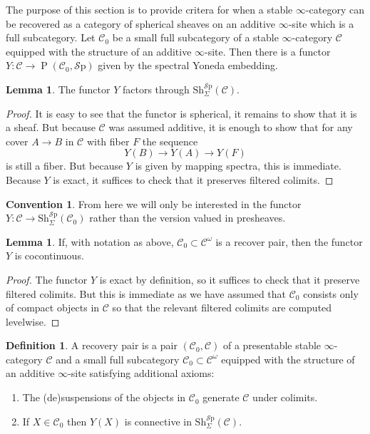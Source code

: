 \documentclass[10pt]{amsart}
\theoremstyle{definition}
\numberwithin{figure}{section}
\numberwithin{equation}{section}
\newtheorem{lemma}[figure]{Lemma}
\newtheorem{definition}[figure]{Definition}
\newtheorem{convention}[figure]{Convention}
\newcommand{\cC}{\mathcal{C}}
\theoremstyle{cited}
\newcommand{\Psh}{\operatorname{P}}
\newcommand{\Sp}{{\mathcal{S}\mathrm{p}}}
\newcommand{\Sh}{\mathrm{Sh}}
\begin{document}
The purpose of this section is to provide critera for when a stable $\infty$-category can be recovered as a category of spherical sheaves on an additive $\infty$-site which is a full subcategory. Let $\cC_0$ be a small full subcategory of a stable $\infty$-category $\cC$ equipped with the structure of an additive $\infty$-site. Then there is a functor $Y:\cC\to \Psh(\cC_0,\Sp)$ given by the spectral Yoneda embedding.

\begin{lemma}
  The functor $Y$ factors through $\Sh_\Sigma^\Sp(\cC)$.
\end{lemma}

\begin{proof}
  It is easy to see that the functor is spherical, it remains to show that it is a sheaf. But because $\cC$ was assumed additive, it is enough to show that for any cover $A\to B$ in $\cC$ with fiber $F$ the sequence
  \[
  Y(B)\to Y(A)\to Y(F)
  \]
  is still a fiber. But because $Y$ is given by mapping spectra, this is immediate. Because $Y$ is exact, it suffices to check that it preserves filtered colimits. 
\end{proof}

\begin{convention}
  From here we will only be interested in the functor $Y:\cC\to \Sh_\Sigma^\Sp(\cC_0)$ rather than the version valued in presheaves.
\end{convention}

\begin{lemma}
  \label{lem:recoveryYcocon}
  If, with notation as above, $\cC_0\subset \cC^\omega$ is a recover pair, then the functor $Y$ is cocontinuous.
\end{lemma}

\begin{proof}
  The functor $Y$ is exact by definition, so it suffices to check that it preserve filtered colimits. But this is immediate as we have assumed that $\cC_0$ consists only of compact objects in $\cC$ so that the relevant filtered colimits are computed levelwise.
\end{proof}

\begin{definition}
  A recovery pair is a pair $(\cC_0,\cC)$ of a presentable stable $\infty$-category $\cC$ and a small full subcategory $\cC_0\subset \cC^\omega$ equipped with the structure of an additive $\infty$-site satisfying additional axioms:
  \begin{enumerate}
    \item The (de)suspensions of the objects in $\cC_0$ generate $\cC$ under colimits.
    \item If $X\in \cC_0$ then $Y(X)$ is connective in $\Sh_\Sigma^\Sp(\cC)$.
  \end{enumerate}
\end{definition}
\end{document}
